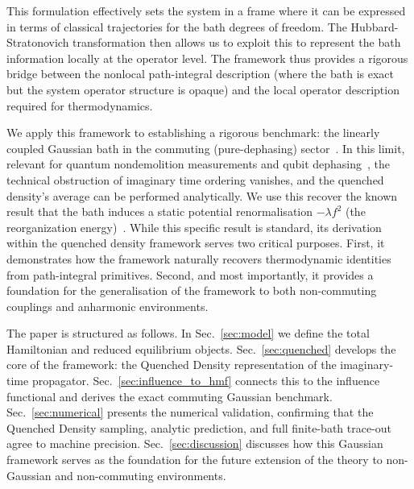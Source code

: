 This formulation effectively sets the system in a frame where it can be expressed in terms of classical trajectories for the bath degrees of freedom. The Hubbard-Stratonovich transformation then allows us to exploit this to represent the bath information locally at the operator level. The framework thus provides a rigorous bridge between the nonlocal path-integral description (where the bath is exact but the system operator structure is opaque) and the local operator description required for thermodynamics.

We apply this framework to establishing a rigorous benchmark: the linearly coupled Gaussian bath in the commuting (pure-dephasing) sector~\cite{clerkIntroductionQuantumNoise2010,breuerTheoryOpenQuantum2002}. In this limit, relevant for quantum nondemolition measurements and qubit dephasing~\cite{makhlinQuantumStateEngineering2001,palmaQuantumComputersDissipation1996}, the technical obstruction of imaginary time ordering vanishes, and the quenched density's average can be performed analytically. We use this recover the known result that the bath induces a static potential renormalisation $-\lambda f^2$ (the reorganization energy)~\cite{campisiTalknerHanggi2009Solvable}. While this specific result is standard, its derivation within the quenched density framework serves two critical purposes. First, it demonstrates how the framework naturally recovers thermodynamic identities from path-integral primitives. Second, and most importantly, it provides a foundation for the generalisation of the framework to both non-commuting couplings and anharmonic environments.

The paper is structured as follows. In Sec.~\ref{sec:model} we define the total Hamiltonian and reduced equilibrium objects. Sec.~\ref{sec:quenched} develops the core of the framework: the Quenched Density representation of the imaginary-time propagator. Sec.~\ref{sec:influence_to_hmf} connects this to the influence functional and derives the exact commuting Gaussian benchmark. Sec.~\ref{sec:numerical} presents the numerical validation, confirming that the Quenched Density sampling, analytic prediction, and full finite-bath trace-out agree to machine precision. Sec.~\ref{sec:discussion} discusses how this Gaussian framework serves as the foundation for the future extension of the theory to non-Gaussian and non-commuting environments.
